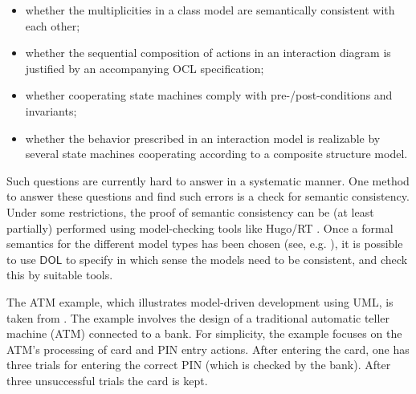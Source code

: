 \documentclass[10pt, a4paper]{isov2}
\newcommand*{\DOL}{\ensuremath{\mathsf{DOL}}\xspace}
\begin{document}
\begin{itemize}
\item whether the multiplicities in a class model are semantically consistent with each other;
\item	  whether the sequential composition of actions in an interaction diagram is justified by an accompanying OCL specification;
\item 	whether cooperating state machines comply with pre-/post-conditions and invariants;
\item 	whether the behavior prescribed in an interaction model is realizable by several state machines cooperating according to a composite structure model.
\end{itemize}
Such questions are currently hard to answer in a systematic manner. One method to answer these questions and find such errors is a check for semantic 
consistency. Under some restrictions, the proof of semantic consistency can be (at least partially) performed using model-checking tools like Hugo/RT \cite{knapp-wuttke:models06wsh:2007}. 
Once a formal semantics for the different model types has been chosen (see, e.g. \cite{knapp-mossakowski-roggenbach:corr:2014}), it is possible to use \DOL to specify in which 
sense the models need to be consistent, and check this by suitable tools.


\label{sec:atm-example}

 The ATM example, which illustrates model-driven development using UML,
is taken from \cite{knapp-mossakowski-roggenbach:corr:2014}.  The example involves
the design of a traditional automatic teller machine (ATM) connected
to a bank. For simplicity,  the example focuses
 on the ATM's processing of card and PIN entry actions.  
After entering the card, one has three
trials for entering the correct PIN (which is checked by the
bank). After three unsuccessful trials the card is kept.
\end{document}
